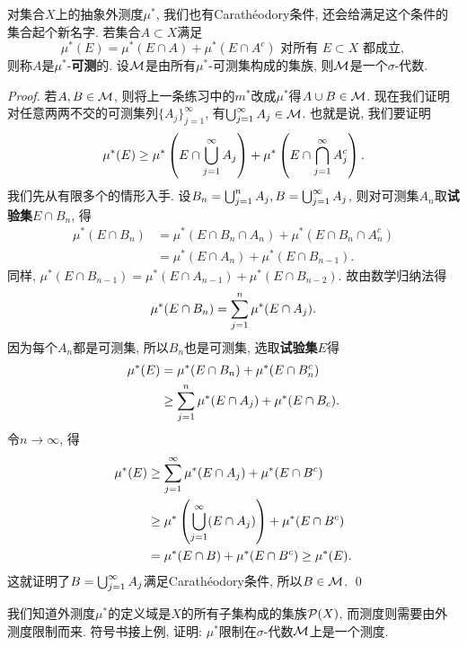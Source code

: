 \begin{example}\label{Caratheodory_thm}
    对集合$X$上的抽象外测度$\mu^*$, 我们也有Carath\'eodory条件, 还会给满足这个条件的集合起个新名字. 若集合$A \subset X$满足
    $$\mu^*(E) = \mu^*(E \cap A) + \mu^*(E \cap A^c) \text{ 对所有 }E \subset X\text{ 都成立},$$
    则称$A$是$\mu^*$-\textbf{可测}的. 设$\mathcal{M}$是由所有$\mu^*$-可测集构成的集族, 则$\mathcal{M}$是一个$\sigma$-代数.
\end{example}
\begin{proof}
    若$A,B \in \mathcal{M}$, 则将上一条练习中的$m^*$改成$\mu^*$得$A \cup B \in \mathcal{M}$. 现在我们证明对任意两两不交的可测集列$\{A_j\}_{j=1}^{\infty}$, 有$\bigcup_{j=1}^{\infty}A_j \in \mathcal{M}$. 也就是说, 我们要证明
    $$\mu^*(E) \geq \mu^*\left(E \cap \bigcup_{j=1}^{\infty}A_j\right) + \mu^*\left(E \cap \bigcap_{j=1}^{\infty}A_j^c\right). $$
    我们先从有限多个的情形入手. 设$B_n = \bigcup_{j=1}^{n}A_j, B = \bigcup_{j=1}^{\infty}A_j$, 则对可测集$A_n$取\textbf{试验集}$E \cap B_n$, 得
    \begin{align*}
    \mu^*(E \cap B_n) &= \mu^*(E \cap B_n \cap A_n) + \mu^*(E \cap B_n \cap A_n^c) \\
    &= \mu^*(E \cap A_n) + \mu^*(E \cap B_{n-1}).
    \end{align*}
    同样, $\mu^*(E \cap B_{n-1}) = \mu^*(E \cap A_{n-1}) + \mu^*(E \cap B_{n-2})$. 故由数学归纳法得
    $$\mu^*(E \cap B_n) = \sum_{j=1}^{n} \mu^*(E \cap A_j). $$
    因为每个$A_n$都是可测集, 所以$B_n$也是可测集, 选取\textbf{试验集}$E$得
    \begin{align*}
    \mu^*(E) &= \mu^*(E \cap B_n) + \mu^*(E \cap B_n^c) \\
    &\geq \sum_{j=1}^{n}\mu^*(E \cap A_j) + \mu^*(E \cap B_c).
    \end{align*}
    令$n \to \infty$, 得
    \begin{align*}
    \mu^*(E) 
    &\geq \sum_{j=1}^{\infty}\mu^*(E \cap A_j) + \mu^*(E \cap B^c) \\
    &\geq \mu^*\left(\bigcup_{j=1}^{\infty}(E \cap A_j)\right) + \mu^*(E \cap B^c) \\
    &= \mu^*(E \cap B) + \mu^*(E \cap B^c) \geq \mu^*(E). 
    \end{align*}
    这就证明了$B=\bigcup_{j=1}^{\infty}A_j$满足Carath\'eodory条件, 所以$B \in \mathcal{M}$.  \qed 
\end{proof}
\begin{exercise}
    我们知道外测度$\mu^*$的定义域是$X$的所有子集构成的集族$\mathcal{P}(X)$, 而测度则需要由外测度限制而来. 符号书接上例, 证明:
    $\mu^*$限制在$\sigma$-代数$\mathcal{M}$上是一个测度. 
\end{exercise}
